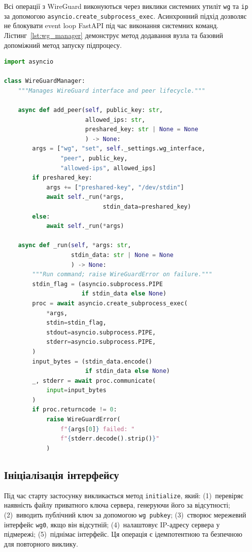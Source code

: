 Всі операції з WireGuard виконуються через виклики системних утиліт
\texttt{wg} та \texttt{ip} за допомогою \texttt{asyncio.create\_subprocess\_exec}.
Асинхронний підхід дозволяє не блокувати event loop FastAPI під час
виконання системних команд. Лістинг~\ref{lst:wg_manager} демонструє метод
додавання вузла та базовий допоміжний метод запуску підпроцесу.

\begin{lstlisting}[style=mystyle, language=Python,
  caption={WireGuardManager: додавання вузла та запуск підпроцесу},
  label={lst:wg_manager}]
import asyncio

class WireGuardManager:
    """Manages WireGuard interface and peer lifecycle."""

    async def add_peer(self, public_key: str,
                       allowed_ips: str,
                       preshared_key: str | None = None
                       ) -> None:
        args = ["wg", "set", self._settings.wg_interface,
                "peer", public_key,
                "allowed-ips", allowed_ips]
        if preshared_key:
            args += ["preshared-key", "/dev/stdin"]
            await self._run(*args,
                            stdin_data=preshared_key)
        else:
            await self._run(*args)

    async def _run(self, *args: str,
                   stdin_data: str | None = None
                   ) -> None:
        """Run command; raise WireGuardError on failure."""
        stdin_flag = (asyncio.subprocess.PIPE
                      if stdin_data else None)
        proc = await asyncio.create_subprocess_exec(
            *args,
            stdin=stdin_flag,
            stdout=asyncio.subprocess.PIPE,
            stderr=asyncio.subprocess.PIPE,
        )
        input_bytes = (stdin_data.encode()
                       if stdin_data else None)
        _, stderr = await proc.communicate(
            input=input_bytes
        )
        if proc.returncode != 0:
            raise WireGuardError(
                f"{args[0]} failed: "
                f"{stderr.decode().strip()}"
            )
\end{lstlisting}

\subsection{Ініціалізація інтерфейсу}

Під час старту застосунку викликається метод \texttt{initialize}, який:
(1)~перевіряє наявність файлу приватного ключа сервера, генеруючи його
за відсутності; (2)~виводить публічний ключ за допомогою \texttt{wg pubkey};
(3)~створює мережевий інтерфейс \texttt{wg0}, якщо він відсутній;
(4)~налаштовує IP-адресу сервера у підмережі; (5)~піднімає інтерфейс.
Ця операція є ідемпотентною та безпечною для повторного виклику.

